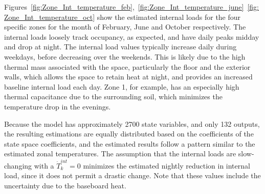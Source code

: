 Figures~\ref{fig:Zone_Int_temperature_feb},~\ref{fig:Zone_Int_temperature_june}~\ref{fig:Zone_Int_temperature_oct} show the estimated internal loads for the four specific zones for the month of February, June and October respectively. The internal loads loosely track occupancy, as expected, and have daily peaks midday and drop at night.  The internal load values typically increase daily during weekdays, before decreasing over the weekends.  This is likely due to the high thermal mass associated with the space, particularly the floor and the exterior walls, which allows the space to retain heat at night, and provides an increased baseline internal load each day.  Zone 1, for example, has an especially high thermal capacitance due to the surrounding soil, which minimizes the temperature drop in the evenings.         

Because the model has approximately 2700 state variables, and only 132 outputs, the resulting estimations are equally distributed based on the coefficients of the state space coefficients, and the estimated results follow a pattern similar to the estimated zonal temperatures.  The assumption that the internal loads are slow-changing with a $\dot{T}_k^{int} = 0$ minimizes the estimated nightly reduction in internal load, since it does not permit a drastic change.  Note that these values include the uncertainty due to the baseboard heat.     



